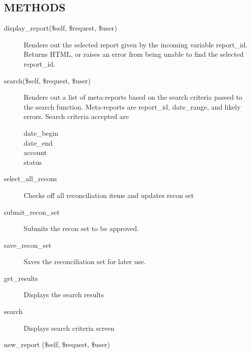 \begin{description}
\subsection*{METHODS\label{LedgerSMB::Scripts::recon_METHODS}}
\begin{description}

\item[{display\_report(\$self, \$request, \$user)}] \mbox{}

Renders out the selected report given by the incoming variable report\_id.
Returns HTML, or raises an error from being unable to find the selected
report\_id.


\item[{search(\$self, \$request, \$user)}] \mbox{}

Renders out a list of meta-reports based on the search criteria passed to the
search function.
Meta-reports are report\_id, date\_range, and likely errors.
Search criteria accepted are

\begin{description}

\item[{date\_begin}] \mbox{}
\item[{date\_end}] \mbox{}
\item[{account}] \mbox{}
\item[{status}] \mbox{}\end{description}

\item[{select\_all\_recons}] \mbox{}

Checks off all reconciliation items and updates recon set


\item[{submit\_recon\_set}] \mbox{}

Submits the recon set to be approved.


\item[{save\_recon\_set}] \mbox{}

Saves the reconciliation set for later use.


\item[{get\_results}] \mbox{}

Displays the search results


\item[{search}] \mbox{}

Displays search criteria screen


\item[{new\_report (\$self, \$request, \$user)}] \mbox{}


\end{description}
\end{description}
